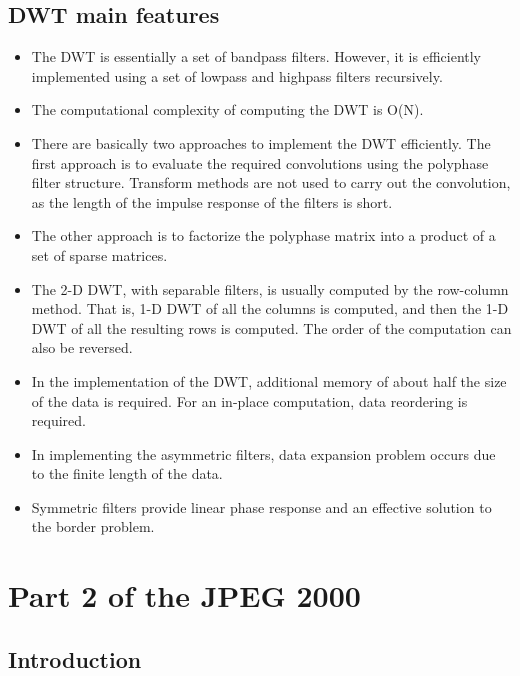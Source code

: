 \subsection{DWT main features}

\begin{itemize}
    \item The DWT is essentially a set of bandpass filters. However, it is efficiently implemented
    using a set of lowpass and highpass filters recursively.
    \item The computational complexity of computing the DWT is O(N).
    \item There are basically two approaches to implement the DWT efficiently. The first approach is
    to evaluate the required convolutions using the polyphase filter structure. Transform methods
    are not used to carry out the convolution, as the length of the impulse response of the
    filters is short.
    \item The other approach is to factorize the polyphase matrix into a product of a set of sparse
    matrices.
    \item The 2-D DWT, with separable filters, is usually computed by the row-column method. That
    is, 1-D DWT of all the columns is computed, and then the 1-D DWT of all the resulting
    rows is computed. The order of the computation can also be reversed.
    \item In the implementation of the DWT, additional memory of about half the size of the data is
    required. For an in-place computation, data reordering is required.
    \item In implementing the asymmetric filters, data expansion problem occurs due to the finite
    length of the data.
    \item Symmetric filters provide linear phase response and an effective solution to the border
    problem.
\end{itemize}

\section{Part 2 of the JPEG 2000}


\subsection{Introduction}

